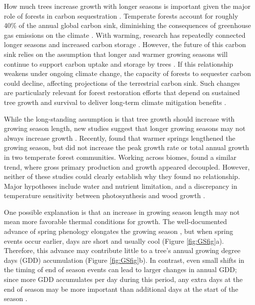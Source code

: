 \documentclass{article}\usepackage[]{graphicx}\usepackage[]{xcolor}
\begin{document}
How much trees increase growth with longer seasons is important given the major role of forests in carbon sequestration \citep{friedlingstein_global_2026}. Temperate forests account for roughly 40\% of the annual global carbon sink, diminishing the consequences of greenhouse gas emissions on the climate \citep{gibbs_revised_2025}. With warming, research has repeatedly connected longer seasons and increased carbon storage \citep{boisvenue_impacts_2006,gaoEarlierStartThermal2022,finziCarbonBudgetHarvard2020}. However, the future of this carbon sink relies on the assumption that longer and warmer growing seasons will continue to support carbon uptake and storage by trees \citep{pan_enduring_2024}. If this relationship weakens under ongoing climate change, the capacity of forests to sequester carbon could decline, affecting projections of the terrestrial carbon sink. Such changes are particularly relevant for forest restoration efforts that depend on sustained tree growth and survival to deliver long-term climate mitigation benefits \citep{cook-patton_mapping_2020}. 


While the long-standing assumption is that tree growth should increase with growing season length, new studies suggest that longer growing seasons may not always increase growth \citep{dow_warm_2022,silvestro_longer_2023,matula_shifts_2023,charletdesauvage_temperature_2022,cabon_crossbiome_2022}. Recently, \cite{dow_warm_2022} found that warmer springs lengthened the growing season, but did not increase the peak growth rate or total annual growth in two temperate forest communities. Working across biomes, \cite{cabon_crossbiome_2022} found a similar trend, where gross primary production and growth appeared decoupled. However, neither of these studies could clearly establish why they found no relationship. Major hypotheses include water and nutrient limitation, and a discrepancy in temperature sensitivity between photosynthesis and wood growth \citep{cabon_crossbiome_2022,dow_warm_2022}.

One possible explanation is that an increase in growing season length may not mean more favorable thermal conditions for growth. The well-documented advance of spring phenology elongates the growing season \citep{keenan_net_2014}, but when spring events occur earlier, days are short and usually cool (Figure \ref{fig:GSfig}a). Therefore, this advance may contribute little to a tree's annual growing degree days (GDD) accumulation (Figure \ref{fig:GSfig}b). In contrast, even small shifts in the timing of end of season events can lead to larger changes in annual GDD; since more GDD accumulates per day during this period, any extra days at the end of season may be more important than additional days at the start of the season \citep{buonaiuto_early_2026}.  
\end{document}
